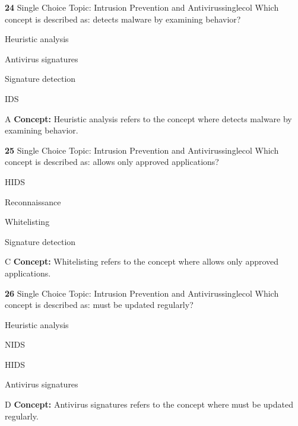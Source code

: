 \documentclass[10pt,a4paper]{article}
\begin{document}
\begin{qcard}{\color{white}\textbf{24} \hfill \small Single Choice \textbar{} Topic: Intrusion Prevention and Antivirus}{singlecol}
Which concept is described as: detects malware by examining behavior?

\begin{qoptions}
\item Heuristic analysis
\item Antivirus signatures
\item Signature detection
\item IDS
\end{qoptions}
\begin{explainbox}{A}
\textbf{Concept:} Heuristic analysis refers to the concept where detects malware by examining behavior.
\end{explainbox}
\end{qcard}

\begin{qcard}{\color{white}\textbf{25} \hfill \small Single Choice \textbar{} Topic: Intrusion Prevention and Antivirus}{singlecol}
Which concept is described as: allows only approved applications?

\begin{qoptions}
\item HIDS
\item Reconnaissance
\item Whitelisting
\item Signature detection
\end{qoptions}
\begin{explainbox}{C}
\textbf{Concept:} Whitelisting refers to the concept where allows only approved applications.
\end{explainbox}
\end{qcard}

\begin{qcard}{\color{white}\textbf{26} \hfill \small Single Choice \textbar{} Topic: Intrusion Prevention and Antivirus}{singlecol}
Which concept is described as: must be updated regularly?

\begin{qoptions}
\item Heuristic analysis
\item NIDS
\item HIDS
\item Antivirus signatures
\end{qoptions}
\begin{explainbox}{D}
\textbf{Concept:} Antivirus signatures refers to the concept where must be updated regularly.
\end{explainbox}
\end{qcard}
\end{document}
